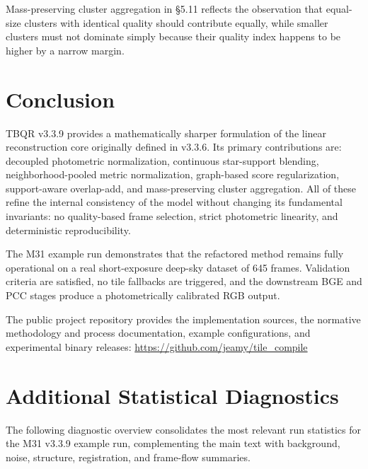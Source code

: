 \documentclass[10pt,twocolumn]{article}
\begin{document}
Mass-preserving cluster aggregation in §5.11 reflects the observation that equal-size clusters
with identical quality should contribute equally, while smaller clusters must not dominate
simply because their quality index happens to be higher by a narrow margin.

\section{Conclusion}

TBQR v3.3.9 provides a mathematically sharper formulation of the linear reconstruction core
originally defined in v3.3.6. Its primary contributions are: decoupled photometric normalization,
continuous star-support blending, neighborhood-pooled metric normalization, graph-based score
regularization, support-aware overlap-add, and mass-preserving cluster aggregation. All of these
refine the internal consistency of the model without changing its fundamental invariants: no
quality-based frame selection, strict photometric linearity, and deterministic reproducibility.

\noindent
The M31 example run demonstrates that the refactored method remains fully operational on a real
short-exposure deep-sky dataset of 645 frames. Validation criteria are satisfied, no tile
fallbacks are triggered, and the downstream BGE and PCC stages produce a photometrically
calibrated RGB output.

\noindent
The public project repository provides the implementation sources, the normative methodology
and process documentation, example configurations, and experimental binary releases:
\url{https://github.com/jeamy/tile_compile}

\section*{Additional Statistical Diagnostics}

\noindent
The following diagnostic overview consolidates the most relevant run statistics for the M31
v3.3.9 example run, complementing the main text with background, noise, structure,
registration, and frame-flow summaries.
\end{document}
